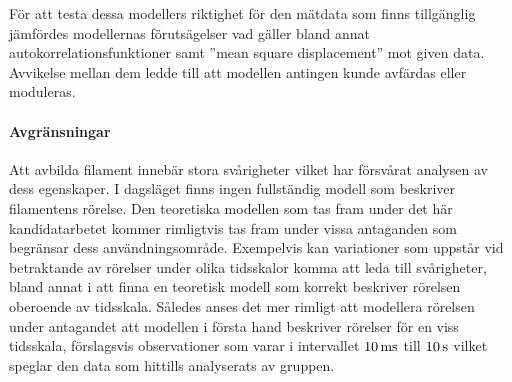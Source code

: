 För att testa dessa modellers riktighet för den mätdata som finns tillgänglig jämfördes modellernas förutsägelser vad gäller bland annat autokorrelationsfunktioner samt ''mean square displacement'' mot given data. Avvikelse mellan dem ledde till att modellen antingen kunde 
avfärdas eller moduleras.


\paragraph{Avgränsningar}
Att avbilda filament innebär stora svårigheter vilket har försvårat analysen av dess egenskaper. I dagsläget finns ingen fullständig modell som beskriver filamentens rörelse. Den teoretiska modellen som tas fram under det här kandidatarbetet kommer rimligtvis tas fram under vissa antaganden som begränsar dess användningsområde. Exempelvis kan variationer som uppstår vid betraktande av rörelser under olika tidsskalor komma att leda till svårigheter, bland annat i att finna en teoretisk modell som korrekt beskriver rörelsen oberoende av tidsskala. Således anses det mer rimligt att modellera rörelsen under antagandet att modellen i första hand beskriver rörelser för en viss tidsskala, förslagsvis observationer som varar i intervallet $\unit[10]{ms}$ till $\unit[10]{s}$ vilket speglar den data som hittills analyserats av gruppen.







